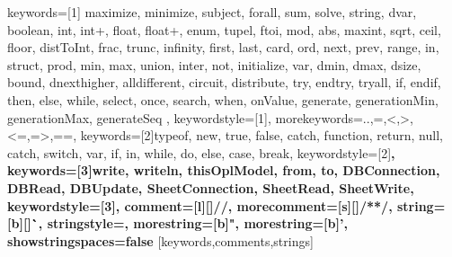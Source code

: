 %
{
  keywords=[1]{
    maximize, minimize, subject, forall, sum, solve, string, dvar, boolean, int, int+, float, float+, enum, tupel, ftoi, mod, abs, maxint, sqrt, ceil, floor, distToInt, frac, trunc, infinity, first, last, card, ord, next, prev, range, in, struct, prod, min, max, union, inter, not, initialize, var, dmin, dmax, dsize, bound, dnexthigher, alldifferent, circuit, distribute, try, endtry, tryall, if, endif, then, else, while, select, once, search, when, onValue, generate, generationMin, generationMax, generateSeq
  },
  keywordstyle=[1]\color{eclipse-keywords},
  morekeywords={..,=,<,>,<=,=>,==},
  keywords=[2]{typeof, new, true, false, catch, function, return, null, catch, switch, var, if, in, while, do, else, case, break},
  keywordstyle=[2]\color{orange}\bfseries,
  keywords=[3]{write, writeln, thisOplModel, from, to, DBConnection, DBRead, DBUpdate, SheetConnection, SheetRead, SheetWrite},
  keywordstyle=[3]\color{RedViolet}\bfseries,
  comment=[l][\color{eclipse-comments}]{//},%
  morecomment=[s][\color{eclipse-comments}]{/*}{*/},%
  string=[b][\color{eclipse-strings}]\``,%
  stringstyle=\color{mymauve}\ttfamily,
  morestring=[b]",%
  morestring=[b]',%
  showstringspaces=false
}[keywords,comments,strings]%


